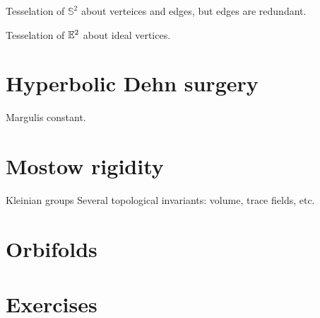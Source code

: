 \documentclass{../../large}
\begin{document}
\begin{prb}
Tesselation of $\mathbb{S}^2$ about verteices and edges, but edges are redundant.
\end{prb}

\begin{prb}
Tesselation of $\mathbb{E}^2$ about ideal vertices.

\end{prb}



\section{Hyperbolic Dehn surgery}



\begin{prb}
\end{prb}

\begin{prb}
Margulis constant.
\end{prb}

\begin{prb}
\end{prb}


\section{Mostow rigidity}
Kleinian groups
Several topological invariants: volume, trace fields, etc.


\section{Orbifolds}


\section*{Exercises}
\end{document}

